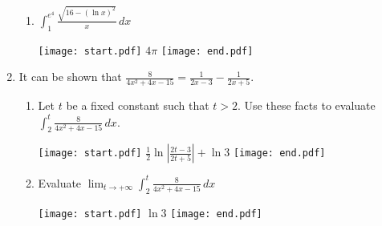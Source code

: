 \documentclass[12pt]{article}
\begin{document}
\begin{enumerate}
\begin{enumerate}
\item $\int_1^{e^4} \frac{\sqrt{16-(\ln{x})^2}}{x} \,dx$

\texttt{[image: start.pdf]}
{{$4\pi$}}
\texttt{[image: end.pdf]}


\end{enumerate}

\item It can be shown that $\frac{8}{4x^2+4x-15}=\frac{1}{2x-3}-\frac{1}{2x+5}$.

\begin{enumerate}

\item Let $t$ be a fixed constant such that $t>2$.  Use these facts to evaluate $\int_2^t \frac{8}{4x^2+4x-15} \,dx$.

\texttt{[image: start.pdf]}
{{$\frac{1}{2}\ln{\left|\frac{2t-3}{2t+5}\right|}+\ln{3}$}}
\texttt{[image: end.pdf]}


\item Evaluate $\lim_{t \rightarrow +\infty} \int_2^t \frac{8}{4x^2+4x-15} \,dx$

\texttt{[image: start.pdf]}
{{$\ln{3}$}}
\texttt{[image: end.pdf]}


\end{enumerate}

\end{enumerate}
\end{document}
